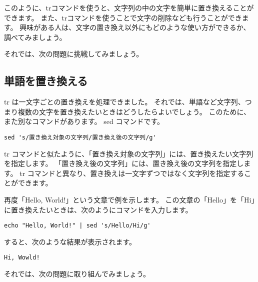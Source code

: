 このように、trコマンドを使うと、文字列の中の文字を簡単に置き換えることができます。
また、trコマンドを使うことで文字の削除なども行うことができます。
興味がある人は、文字の置き換え以外にもどのような使い方ができるか、調べてみましょう。

それでは、次の問題に挑戦してみましょう。
\begin{enumerate}
\end{enumerate}

\subsection{単語を置き換える}
tr は一文字ごとの置き換えを処理できました。
それでは、単語など文字列、つまり複数の文字を置き換えたいときはどうしたらよいでしょう。
このために、また別なコマンドがあります。
sed コマンドです。

\begin{lstlisting}[caption=sed コマンドの基本的な使い方, label=sed_usage]
sed 's/置き換え対象の文字列/置き換え後の文字列/g'
\end{lstlisting}

tr コマンドと似たように、「置き換え対象の文字列」には、置き換えたい文字列を指定します。
「置き換え後の文字列」には、置き換え後の文字列を指定します。
tr コマンドと異なり、置き換えは一文字ずつではなく文字列を指定することができます。

再度「Hello, World!」という文章で例を示します。
この文章の「Hello」を「Hi」に置き換えたいときは、次のようにコマンドを入力します。

\begin{lstlisting}[caption=sed コマンドを使った例, label=sed_app]
echo "Hello, World!" | sed 's/Hello/Hi/g'
\end{lstlisting}

すると、次のような結果が表示されます。

\begin{lstlisting}[caption=sed コマンドで変換した結果, label=sed_result]
Hi, Wowld!
\end{lstlisting}

それでは、次の問題に取り組んでみましょう。

\begin{enumerate}
\end{enumerate}

